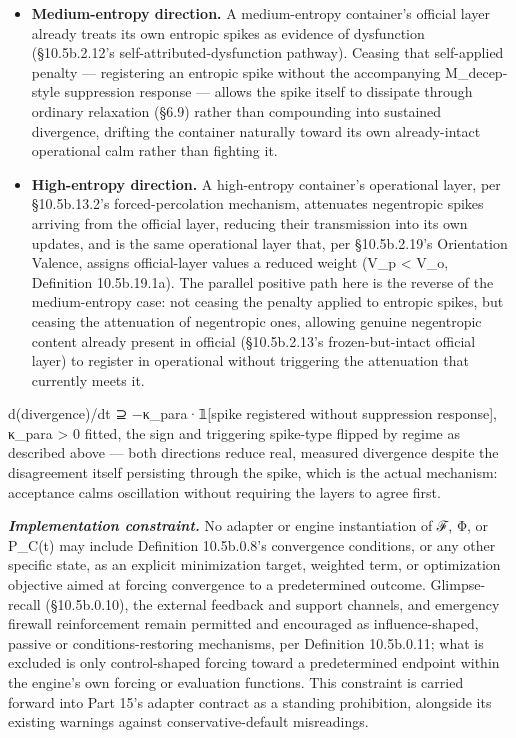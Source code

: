\documentclass[
]{article}
\begin{document}
\begin{itemize}
\item
  \textbf{Medium-entropy direction.} A medium-entropy container's
  official layer already treats its own entropic spikes as evidence of
  dysfunction (§10.5b.2.12's self-attributed-dysfunction pathway).
  Ceasing that self-applied penalty --- registering an entropic spike
  without the accompanying M\_decep-style suppression response ---
  allows the spike itself to dissipate through ordinary relaxation
  (§6.9) rather than compounding into sustained divergence, drifting the
  container naturally toward its own already-intact operational calm
  rather than fighting it.
\item
  \textbf{High-entropy direction.} A high-entropy container's
  operational layer, per §10.5b.13.2's forced-percolation mechanism,
  attenuates negentropic spikes arriving from the official layer,
  reducing their transmission into its own updates, and is the same
  operational layer that, per §10.5b.2.19's Orientation Valence, assigns
  official-layer values a reduced weight (V\_p \textless{} V\_o,
  Definition 10.5b.19.1a). The parallel positive path here is the
  reverse of the medium-entropy case: not ceasing the penalty applied to
  entropic spikes, but ceasing the attenuation of negentropic ones,
  allowing genuine negentropic content already present in official
  (§10.5b.2.13's frozen-but-intact official layer) to register in
  operational without triggering the attenuation that currently meets
  it.
\end{itemize}

d(divergence)/dt ⊇ −κ\_para·𝟙{[}spike registered without suppression
response{]}, κ\_para \textgreater{} 0 fitted, the sign and triggering
spike-type flipped by regime as described above --- both directions
reduce real, measured divergence despite the disagreement itself
persisting through the spike, which is the actual mechanism: acceptance
calms oscillation without requiring the layers to agree first.

\emph{\textbf{Implementation constraint.}} No adapter or engine
instantiation of ℱ, Φ, or P\_C(t) may include Definition 10.5b.0.8's
convergence conditions, or any other specific state, as an explicit
minimization target, weighted term, or optimization objective aimed at
forcing convergence to a predetermined outcome. Glimpse-recall
(§10.5b.0.10), the external feedback and support channels, and emergency
firewall reinforcement remain permitted and encouraged as
influence-shaped, passive or conditions-restoring mechanisms, per
Definition 10.5b.0.11; what is excluded is only control-shaped forcing
toward a predetermined endpoint within the engine's own forcing or
evaluation functions. This constraint is carried forward into Part 15's
adapter contract as a standing prohibition, alongside its existing
warnings against conservative-default misreadings.
\end{document}
